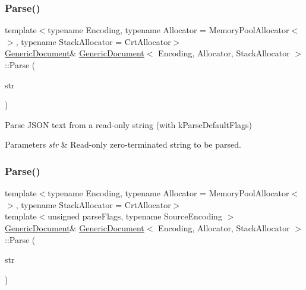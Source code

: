 \subsubsection{\texorpdfstring{Parse()}{Parse()}\hspace{0.1cm}{\footnotesize\ttfamily [3/6]}}
{\footnotesize\ttfamily template$<$typename Encoding, typename Allocator = Memory\+Pool\+Allocator$<$$>$, typename Stack\+Allocator = Crt\+Allocator$>$ \\
\hyperlink{classGenericDocument}{Generic\+Document}\& \hyperlink{classGenericDocument}{Generic\+Document}$<$ Encoding, Allocator, Stack\+Allocator $>$\+::Parse (\begin{DoxyParamCaption}\item[{const \hyperlink{classGenericValue_ade0e0ce64ccd5d852da57a35e720bafb}{Ch} $\ast$}]{str }\end{DoxyParamCaption})\hspace{0.3cm}{\ttfamily [inline]}}



Parse J\+S\+ON text from a read-\/only string (with k\+Parse\+Default\+Flags) 


\begin{DoxyParams}{Parameters}
{\em str} & Read-\/only zero-\/terminated string to be parsed. \\
\hline
\end{DoxyParams}
\mbox{\label{classGenericDocument_aadee36db7064cc9894a75c848831cdae}} 
\subsubsection{\texorpdfstring{Parse()}{Parse()}\hspace{0.1cm}{\footnotesize\ttfamily [4/6]}}
{\footnotesize\ttfamily template$<$typename Encoding, typename Allocator = Memory\+Pool\+Allocator$<$$>$, typename Stack\+Allocator = Crt\+Allocator$>$ \\
template$<$unsigned parse\+Flags, typename Source\+Encoding $>$ \\
\hyperlink{classGenericDocument}{Generic\+Document}\& \hyperlink{classGenericDocument}{Generic\+Document}$<$ Encoding, Allocator, Stack\+Allocator $>$\+::Parse (\begin{DoxyParamCaption}\item[{const typename Source\+Encoding\+::\+Ch $\ast$}]{str }\end{DoxyParamCaption})\hspace{0.3cm}{\ttfamily [inline]}}



